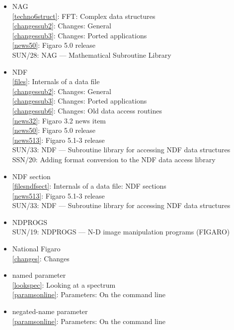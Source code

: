 \documentclass[11pt,twoside]{article}
\newcommand{\htmlref}[2]{#1}
\newcommand{\xref}[3]{#1}
\newcommand{\idxint}[2]{\ref{#1}: \htmlref{#2}{#1}}
\newcommand{\idxint}[2]{\htmlref{#2}{#1}}
\newcommand{\latorhtm}[2]{#1}
\newcommand{\latorhtm}[2]{#2}
\begin{document}
\begin{itemize}
\item NAG\\
   \idxint{techno6struct}{FFT: Complex data structures}\\
   \idxint{changessub2}{Changes: General}\\
   \idxint{changessub3}{Changes: Ported applications}\\
   \idxint{news50}{Figaro 5.0 release}\\
   \xref{SUN/28: NAG \latorhtm{---}{-} Mathematical Subroutine Library}{sun28}{}
\item NDF\\
   \idxint{files}{Internals of a data file}\\
   \idxint{changessub2}{Changes: General}\\
   \idxint{changessub3}{Changes: Ported applications}\\
   \idxint{changessub6}{Changes: Old data access routines}\\
   \idxint{news32}{Figaro 3.2 news item}\\
   \idxint{news50}{Figaro 5.0 release}\\
   \idxint{news513}{Figaro 5.1-3 release}\\
   \xref{SUN/33: NDF \latorhtm{---}{-} Subroutine library for accessing NDF data
      structures}{sun33}{}\\
   \xref{SSN/20: Adding format conversion to the NDF data access
      library}{ssn20}{}
\item NDF section\\
   \idxint{filesndfsect}{Internals of a data file: NDF sections}\\
   \idxint{news513}{Figaro 5.1-3 release}\\
   \xref{SUN/33: NDF \latorhtm{---}{-} Subroutine library for accessing NDF data
      structures}{sun33}{}
\item NDPROGS\\
   \xref{SUN/19: NDPROGS \latorhtm{---}{-} N-D image manipulation programs (FIGARO)}{sun19}{}
\item National Figaro\\
   \idxint{changes}{Changes}
\item named parameter\\
   \idxint{lookspec}{Looking at a spectrum}\\
   \idxint{paramsonline}{Parameters: On the command line}
\item negated-name parameter\\
   \idxint{paramsonline}{Parameters: On the command line}
\end{itemize}
\end{document}
